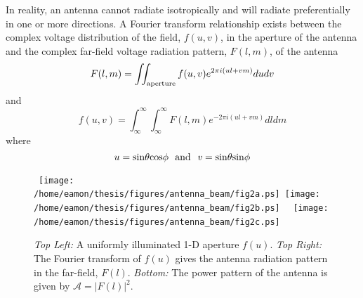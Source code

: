 In reality, an antenna cannot radiate isotropically and will radiate preferentially in one or more directions. A Fourier transform relationship exists between the complex voltage distribution of the field, $f(u,v)$, in the aperture of the antenna and the complex far-field voltage radiation pattern, $F(l,m)$, of the antenna \citep{kraus_1986}
\begin{equation}
F(l,m)=\int\!\!\! \int _{\rm{aperture}} f(u,v)e^{2\pi i(ul+vm)}dudv
\end{equation}
and
\begin{equation}\label{eq:illum1}
f(u,v)=\int ^{\infty} _{\infty}\int ^{\infty} _{\infty} F(l,m)e^{-2\pi i(ul+vm)}dldm
\end{equation}
where
\begin{equation}\label{eq:illum2}
u=\rm{sin}\theta \rm{cos}\phi \ \  \rm{and} \ \ \mathit{v}=\rm{sin}\theta \rm{sin}\phi
\end{equation}

\begin{figure}[H]
\centering 
\mbox{
          \texttt{[image: /home/eamon/thesis/figures/antenna\_beam/fig2a.ps]}
          \texttt{[image: /home/eamon/thesis/figures/antenna\_beam/fig2b.ps]}
          }
\mbox{
          \texttt{[image: /home/eamon/thesis/figures/antenna\_beam/fig2c.ps]}
          }
\caption[Radiation and power pattern of a uniformly illuminated antenna.]{\textit{Top Left:} A uniformly illuminated 1-D aperture $f(u)$. \textit{Top Right:} The Fourier transform of $f(u)$ gives the antenna radiation pattern in the far-field, $F(l)$. \textit{Bottom:} The power pattern of the antenna is given by $\mathcal{A}=|F(l)|^2$.}
\label{fig2.1}
\end{figure}

